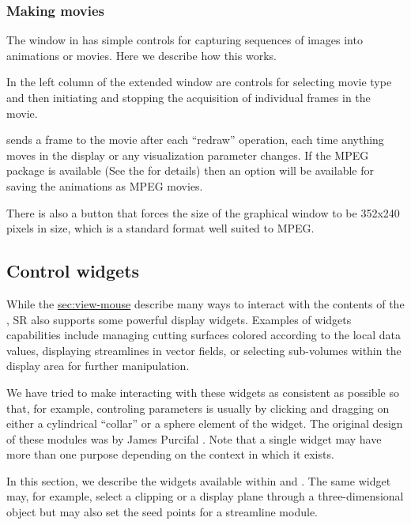 \subsubsection{Making movies}
\label{sec:view-movies} 

The \viewer{} window in \SR{} has simple controls for capturing sequences
of images into animations or movies.  Here we describe how this works.

In the left column of the extended \viewer{} window are controls for
selecting movie type and then initiating and stopping the acquisition of
individual frames in the movie.

\SR{} sends a frame to the movie after each ``redraw'' operation, \ie{}
each time anything moves in the display or any visualization parameter
changes.  If the MPEG package is available (See the
 for
details) then an option will be available for saving the animations as MPEG
movies.

There is also a button that forces the size of the graphical window to be
352x240 pixels in size, which is a standard format well suited to MPEG.

\subsection{Control widgets}
\label{sec:view-widgets} 

While the \hyperref{mouse controls}{mouse controls in
Section}{}{sec:view-mouse} describe many ways to interact with the contents
of the \viewer{}, SR{} also supports some powerful display widgets.
Examples of widgets capabilities include managing cutting surfaces colored
according to the local data values, displaying streamlines in vector
fields, or selecting sub-volumes within the display area for further
manipulation. 
 
We have tried to make interacting with these widgets as consistent as
possible so that, for example, controling parameters is usually by clicking
and dragging on either a cylindrical ``collar'' or a sphere element of the
widget.  The original design of these modules was by James Purcifal
\cite{??}.  Note that a single widget may have more than one purpose
depending on the context in which it exists.

In this section, we describe the widgets available within \SR{} and \PSE{}.
The same widget may, for example, select a clipping or a display plane
through a three-dimensional object but may also set the seed points for a
streamline module.  

